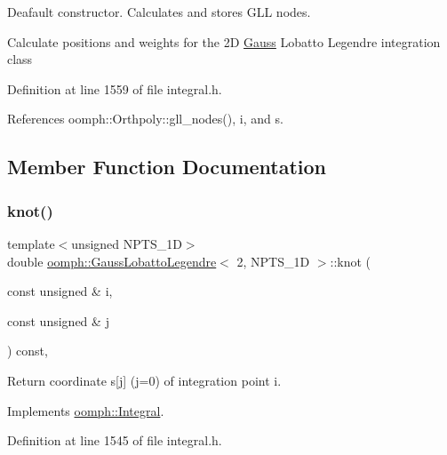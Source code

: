 Deafault constructor. Calculates and stores G\+LL nodes. 

Calculate positions and weights for the 2D \hyperlink{classoomph_1_1Gauss}{Gauss} Lobatto Legendre integration class 

Definition at line 1559 of file integral.\+h.



References oomph\+::\+Orthpoly\+::gll\+\_\+nodes(), i, and s.



\subsection{Member Function Documentation}
\mbox{\label{classoomph_1_1GaussLobattoLegendre_3_012_00_01NPTS__1D_01_4_ae3194b6f3d9bf6d0448cf3d055ed57d1}} 
\subsubsection{\texorpdfstring{knot()}{knot()}}
{\footnotesize\ttfamily template$<$unsigned N\+P\+T\+S\+\_\+1D$>$ \\
double \hyperlink{classoomph_1_1GaussLobattoLegendre}{oomph\+::\+Gauss\+Lobatto\+Legendre}$<$ 2, N\+P\+T\+S\+\_\+1D $>$\+::knot (\begin{DoxyParamCaption}\item[{const unsigned \&}]{i,  }\item[{const unsigned \&}]{j }\end{DoxyParamCaption}) const\hspace{0.3cm}{\ttfamily [inline]}, {\ttfamily [virtual]}}



Return coordinate s\mbox{[}j\mbox{]} (j=0) of integration point i. 



Implements \hyperlink{classoomph_1_1Integral_a1a2122f99a87c18649bafdd9ed739758}{oomph\+::\+Integral}.



Definition at line 1545 of file integral.\+h.



